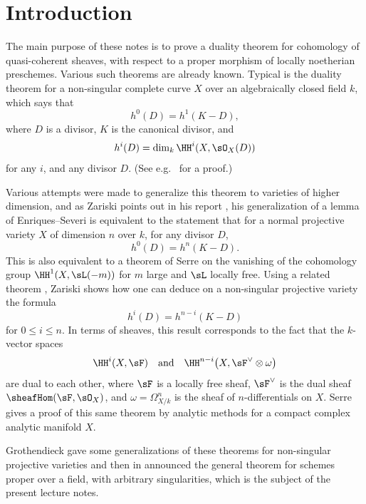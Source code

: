 \chapter*{Introduction}\label{chap:introduction}
\begingroup
\setlength{\emergencystretch}{2em}
\bigskip
The main purpose of these notes is to prove a duality theorem for cohomology of quasi-coherent sheaves, with respect to a proper morphism of locally noetherian preschemes. Various such theorems are already known. Typical is the duality theorem for a non-singular complete curve $X$ over an algebraically closed field $k$, which says that
\[
h^{0}(D)=h^{1}(K-D),
\]
where $D$ is a divisor, $K$ is the canonical divisor, and
\[
h^{i}(D)=\dim_{k} \HH^{i}(X, \sO_{X}(D))
\]
for any $i$, and any divisor $D$. (See e.g.~\cite[\nopp Ch.~II]{16} for a proof.)

Various attempts were made to generalize this theorem to varieties of higher dimension, and as Zariski points out in his report \cite{20}, his generalization of a lemma of Enriques--Severi \cite{19} is equivalent to the statement that for a normal projective variety $X$ of dimension $n$ over $k$, for any divisor $D$,
\[
h^{0}(D)=h^{n}(K-D).
\]
This is also equivalent to a theorem of Serre \cite[\nopp \S76, Thm.~4]{FAC}
on the vanishing of the cohomology group $\HH^{1}(X, \sL(-m))$ for $m$ large and $\sL$ locally free. Using a related theorem \cite[\nopp \S75, Thm.~3]{FAC}, Zariski shows how one can deduce on a non-singular projective variety the formula
\[
h^{i}(D)=h^{n-i}(K-D)
\]
for $0\leq i\leq n$. In terms of sheaves, this result corresponds to the fact that the $k$-vector spaces
\[
\HH^{i}(X, \sF) \quad\text{and}\quad \HH^{n-i}\bigl(X, \sF^{\vee}\otimes\omega\bigr)
\]
are dual to each other, where $\sF$ is a locally free sheaf, $\sF^{\vee}$ is the dual sheaf $\sheafHom(\sF,\sO_{X})$,
 and $\omega=\Omega_{X/k}^{n}$ is the sheaf of $n$-differentials on $X$. Serre \cite{15} gives a proof of this same theorem by analytic methods for a compact complex analytic manifold $X$.

Grothendieck \cite{8} gave some generalizations of these theorems for non-singular projective varieties and then in \cite{9} announced the general theorem for schemes proper over a field, with arbitrary singularities, which is the subject of the present lecture notes.

